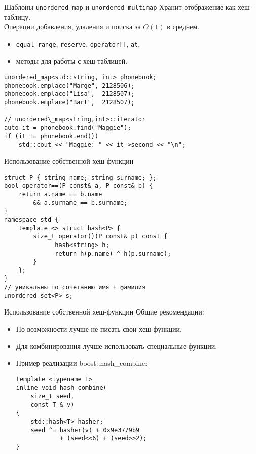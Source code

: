 \documentclass{beamer}
\begin{document}
\begin{frame}[fragile]{Шаблоны {\tt unordered\_map} и {\tt unordered\_multimap}}
Хранит отображение как хеш-таблицу.\\ 
Операции добавления, удаления и поиска за $O(1)$ в среднем.

\begin{itemize}
	\item {\tt equal\_range}, {\tt reserve}, {\tt operator[]}, {\tt at},
	\item методы для работы с хеш-таблицей.
\end{itemize}\vspace{-1mm}
\begin{lstlisting}
unordered_map<std::string, int> phonebook;
phonebook.emplace("Marge", 2128506);
phonebook.emplace("Lisa",  2128507);
phonebook.emplace("Bart",  2128507);

// unordered\_map<string,int>::iterator
auto it = phonebook.find("Maggie");
if (it != phonebook.end())
    std::cout << "Maggie: " << it->second << "\n";
\end{lstlisting}
\end{frame}

\begin{frame}[fragile]{Использование собственной хеш-функции}
\begin{lstlisting}
struct P { string name; string surname; };
bool operator==(P const& a, P const& b) { 		
    return a.name == b.name 
        && a.surname == b.surname; 
}
namespace std {
    template <> struct hash<P> {
        size_t operator()(P const& p) const {
              hash<string> h;
              return h(p.name) ^ h(p.surname);
        }
    };
}
// уникальны по сочетанию имя + фамилия
unordered_set<P> s;
\end{lstlisting}
\end{frame}

\begin{frame}[fragile]{Использование собственной хеш-функции}
    Общие рекомендации:
\begin{itemize}
        \item По возможности лучше не писать свои хеш-функции.
        \item Для комбинирования лучше использовать специальные функции.
        \item Пример реализации boost::hash\_combine:
\begin{lstlisting}
template <typename T>
inline void hash_combine(
    size_t seed,
    const T & v)
{
    std::hash<T> hasher;
    seed ^= hasher(v) + 0x9e3779b9
            + (seed<<6) + (seed>>2);
}
\end{lstlisting}
\end{itemize}
\end{frame}
\end{document}
